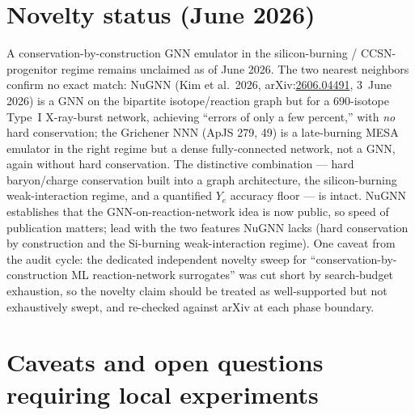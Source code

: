 \documentclass[11pt]{article}
\newcommand{\arxiv}[1]{arXiv:\href{https://arxiv.org/abs/#1}{#1}}
\begin{document}
\section{Novelty status (June 2026)}

A conservation-by-construction GNN emulator in the silicon-burning / CCSN-progenitor regime remains unclaimed as of June 2026. The two nearest neighbors confirm no exact match: NuGNN (Kim et al.\ 2026, \arxiv{2606.04491}, 3~June 2026) is a GNN on the bipartite isotope/reaction graph but for a 690-isotope Type~I X-ray-burst network, achieving ``errors of only a few percent,'' with \emph{no} hard conservation; the Grichener NNN (ApJS 279, 49) is a late-burning MESA emulator in the right regime but a dense fully-connected network, not a GNN, again without hard conservation. The distinctive combination --- hard baryon/charge conservation built into a graph architecture, the silicon-burning weak-interaction regime, and a quantified $Y_e$ accuracy floor --- is intact. NuGNN establishes that the GNN-on-reaction-network idea is now public, so speed of publication matters; lead with the two features NuGNN lacks (hard conservation by construction and the Si-burning weak-interaction regime). One caveat from the audit cycle: the dedicated independent novelty sweep for ``conservation-by-construction ML reaction-network surrogates'' was cut short by search-budget exhaustion, so the novelty claim should be treated as well-supported but not exhaustively swept, and re-checked against arXiv at each phase boundary.

\section{Caveats and open questions requiring local experiments}
\end{document}
